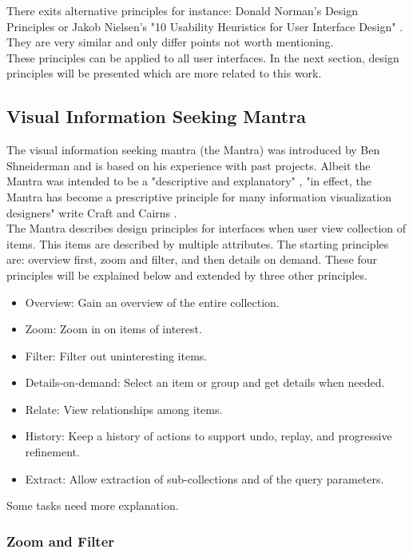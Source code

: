 \documentclass[11pt]{report}
\begin{document}
There exits alternative principles for instance: Donald Norman's Design Principles \cite{Norman2013} or Jakob Nielsen's "10 Usability Heuristics for User Interface Design" \cite{Nielsen1995}. They are very similar and only differ points not worth mentioning. \\

These principles can be applied to all user interfaces. In the next section, design principles will be presented which are more related to this work.

\subsection{Visual Information Seeking Mantra}

The visual information seeking mantra (the Mantra) was introduced by Ben Shneiderman \cite{Shneiderman1996} and is based on his experience with past projects. Albeit the Mantra was intended to be a "descriptive and explanatory" \cite{Card1999}, "in effect, the Mantra has become a prescriptive principle for many information visualization designers" write Craft and Cairns \cite{Craft2005}. \\

The Mantra describes design principles for interfaces when user view collection of items. This items are described by multiple attributes. The starting principles are: overview first, zoom and filter, and then details on demand. These four principles will be explained below and extended by three other principles.
\begin{itemize}
	\item Overview: Gain an overview of the entire collection.
	\item Zoom: Zoom in on items of interest.
	\item Filter: Filter out uninteresting items.
	\item Details-on-demand: Select an item or group and get details when needed.
	\item Relate: View relationships among items.
	\item History: Keep a history of actions to support undo, replay, and progressive refinement.
	\item Extract: Allow extraction of sub-collections and of the query parameters.
\end{itemize}

Some tasks need more explanation.

\subsubsection{Zoom and Filter}
\end{document}
